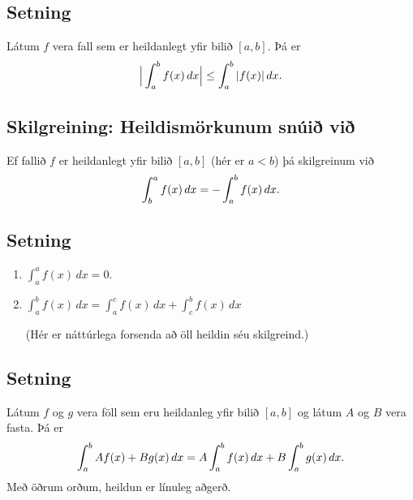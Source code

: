 \documentclass[a4paper,10pt,icelandic]{sphinxmanual}
\begin{document}
\subsection{Setning}
\label{kafli06:id2}
Látum \(f\) vera fall sem er heildanlegt yfir bilið \([a, b]\).
Þá er
\begin{gather}
\begin{split}\Big|\int_a^b f(x)\,dx\Big|\leq \int_a^b |f(x)|\,dx.\end{split}\notag
\end{gather}

\subsection{Skilgreining: Heildismörkunum snúið við}
\label{kafli06:skilgreining-heildismorkunum-snui-vi}
Ef fallið \(f\) er heildanlegt yfir bilið \([a,b]\) (hér er
\(a<b\)) þá skilgreinum við
\begin{gather}
\begin{split}\int_b^a f(x)\,dx=-\int_a^b f(x)\,dx.\end{split}\notag
\end{gather}

\subsection{Setning}
\label{kafli06:id3}\begin{enumerate}
\item {} 
\(\int_a^a f(x)\,dx=0\).

\item {} 
\(\int_a^b f(x)\,dx=\int_a^c f(x)\,dx+\int_c^b f(x)\,dx\)

(Hér er náttúrlega forsenda að öll heildin séu skilgreind.)

\end{enumerate}


\subsection{Setning}
\label{kafli06:id4}
Látum \(f\) og \(g\) vera föll sem eru heildanleg yfir bilið
\([a,b]\) og látum \(A\) og \(B\) vera fasta. Þá er
\begin{gather}
\begin{split}\int_a^b Af(x)+Bg(x)\,dx=A\int_a^b f(x)\,dx+B\int_a^b g(x)\,dx.\end{split}\notag
\end{gather}
Með öðrum orðum, heildun er línuleg aðgerð.
\end{document}
